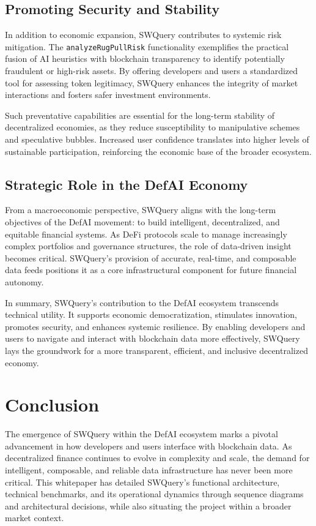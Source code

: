 \documentclass[
]{article}
\begin{document}
\subsection{Promoting Security and Stability}

In addition to economic expansion, SWQuery contributes to systemic risk mitigation. The \texttt{analyzeRugPullRisk} functionality exemplifies the practical fusion of AI heuristics with blockchain transparency to identify potentially fraudulent or high-risk assets. By offering developers and users a standardized tool for assessing token legitimacy, SWQuery enhances the integrity of market interactions and fosters safer investment environments.

Such preventative capabilities are essential for the long-term stability of decentralized economies, as they reduce susceptibility to manipulative schemes and speculative bubbles. Increased user confidence translates into higher levels of sustainable participation, reinforcing the economic base of the broader ecosystem.

\subsection{Strategic Role in the DefAI Economy}

From a macroeconomic perspective, SWQuery aligns with the long-term objectives of the DefAI movement: to build intelligent, decentralized, and equitable financial systems. As DeFi protocols scale to manage increasingly complex portfolios and governance structures, the role of data-driven insight becomes critical. SWQuery's provision of accurate, real-time, and composable data feeds positions it as a core infrastructural component for future financial autonomy.

In summary, SWQuery’s contribution to the DefAI ecosystem transcends technical utility. It supports economic democratization, stimulates innovation, promotes security, and enhances systemic resilience. By enabling developers and users to navigate and interact with blockchain data more effectively, SWQuery lays the groundwork for a more transparent, efficient, and inclusive decentralized economy.

\section{Conclusion}

The emergence of SWQuery within the DefAI ecosystem marks a pivotal advancement in how developers and users interface with blockchain data. As decentralized finance continues to evolve in complexity and scale, the demand for intelligent, composable, and reliable data infrastructure has never been more critical. This whitepaper has detailed SWQuery’s functional architecture, technical benchmarks, and its operational dynamics through sequence diagrams and architectural decisions, while also situating the project within a broader market context.
\end{document}
